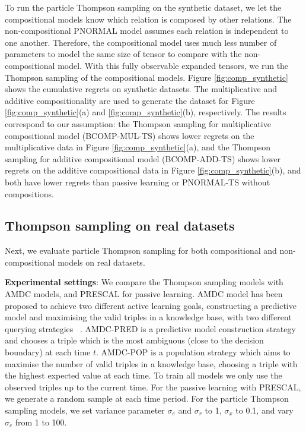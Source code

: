 To run the particle Thompson sampling on the synthetic dataset, we let the 
compositional models know which relation is composed by other relations. 
The non-compositional PNORMAL model assumes each relation is independent to one another. 
Therefore, the compositional model uses much less number of parameters to model 
the same size of tensor to compare with the non-compositional model. 
With this fully observable expanded tensors, we run the Thompson sampling of 
the compositional models.
Figure \ref{fig:comp_synthetic} shows the cumulative regrets on synthetic 
datasets. The multiplicative and additive compositionality are used to 
generate the dataset for Figure \ref{fig:comp_synthetic}(a) and 
\ref{fig:comp_synthetic}(b), respectively. The results correspond to our 
assumption: the Thompson sampling for multiplicative compositional model (BCOMP-MUL-TS) shows lower 
regrets on the multiplicative data in Figure \ref{fig:comp_synthetic}(a), and 
the Thompson sampling for additive compositional model (BCOMP-ADD-TS) shows lower regrets on the 
additive compositional data in Figure \ref{fig:comp_synthetic}(b), 
and both have lower regrets than passive learning or PNORMAL-TS without compositions. 

\subsection{Thompson sampling on real datasets}

Next, we evaluate particle Thompson sampling for both compositional and non-compositional models on real datasets.

\textbf{Experimental settings}: 
We compare the Thompson sampling models with AMDC models, and PRESCAL for passive learning.  
AMDC model has been proposed to achieve two different active learning goals, constructing a predictive
model and maximising the valid triples in a knowledge base, with two different querying strategies
~\cite{kajino2015active}. 
AMDC-PRED is a predictive model construction strategy and chooses a triple which is the most ambiguous (close to the decision boundary) at each time $t$.
AMDC-POP is a population strategy which aims to maximise the number of valid triples in a knowledge base, choosing a triple with the highest expected value at each time.  
To train all models we only use the observed triples up to the current time. For the passive learning with PRESCAL, we generate a random sample at each time period. For the particle Thompson sampling models, we set variance parameter $\sigma_e$ and $\sigma_r$ to 1, $\sigma_x$ to 0.1, and vary $\sigma_c$ from 1 to 100.

